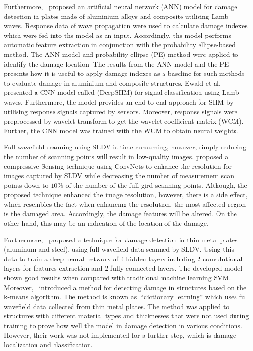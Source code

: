Furthermore,~\textcite{DeFenza2015} proposed an artificial neural network (ANN) model for damage detection in plates made of aluminium alloys and composite utilising Lamb waves.
Response data of wave propagation were used to calculate damage indexes which were fed into the model as an input.
Accordingly, the model performs automatic feature extraction in conjunction with the probability ellipse-based method. 
The ANN model and probability ellipse (PE) method were applied to identify the damage location.
The results from the ANN model and the PE presents how it is useful to apply damage indexes as a baseline for such methods to evaluate damage in aluminium and composite structures. 
Ewald et al.~\cite{Ewald2019} presented a CNN model called (DeepSHM) for signal classification using Lamb waves.
Furthermore, the model provides an end-to-end approach for SHM by utilising response signals captured by sensors.
Moreover, response signals were preprocessed by wavelet transform to get the wavelet coefficient matrix (WCM).
Further, the CNN model was trained with the WCM to obtain neural weights.

Full wavefield scanning using SLDV is time-consuming, however, simply reducing the number of scanning points will result in low-quality images. 
\textcite{esfandabadideep} proposed a compressive Sensing technique using ConvNets to enhance the resolution for images captured by SLDV while decreasing the number of measurement scan points down to \(10\%\) of the number of the full gird scanning points. 
Although, the proposed technique enhanced the image resolution, however, there is a side effect, which resembles the fact when enhancing the resolution, the most affected region is the damaged area. 
Accordingly, the damage features will be altered.
On the other hand, this may be an indication of the location of the damage.

Furthermore,~\textcite{Melville2018} proposed a technique for damage detection in thin metal plates (aluminum and steel), using full wavefield data scanned by SLDV. 
Using this data to train a deep neural network of 4 hidden layers including 2 convolutional layers for features extraction and 2 fully connected layers. 
The developed model shown good results when compared with traditional machine learning SVM.
Moreover,~\textcite{Melville2017} introduced a method for detecting damage in structures based on the k-means algorithm. 
The method is known as~\enquote{dictionary learning} which uses full wavefield data collected from thin metal plates. 
The method was applied to structures with different material types and thicknesses that were not used during training to prove how well the model in damage detection in various conditions. 
However, their work was not implemented for a further step, which is damage localization and classification.

